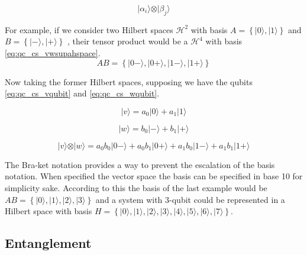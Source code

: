 \begin{equation} 
\label{eq:qc_cs_vwspace} 
\vert \alpha_{i} \rangle \otimes \vert \beta_{j} \rangle
\end{equation}


For example, if we consider two Hilbert spaces $\mathcal{H}^2$ with basis
$ A=\left\{ \vert 0 \rangle , \vert 1 \rangle \right\}$ and 
$B =\left\{ \vert - \rangle, \vert + \rangle \right\}$
, their tensor product would be a $\mathcal{H}^4$ with basis \ref{eq:qc_cs_vwsupahspace}.
\begin{equation}
\label{eq:qc_cs_vwsupahspace}
AB = \left\{ \vert 0  - \rangle, \vert 0 + \rangle, \vert 1 - \rangle,  \vert 1 + \rangle \right\}
\end{equation}

Now taking the former Hilbert spaces, supposing we have the qubits \ref{eq:qc_cs_vqubit} and \ref{eq:qc_cs_wqubit}.

\begin{equation}
\label{eq:qc_cs_vqubit}
\vert v \rangle = a_{0}\vert 0\rangle + a_{1}\vert 1 \rangle
\end{equation}

\begin{equation}
\label{eq:qc_cs_wqubit}
\vert w \rangle = b_{0}\vert -\rangle + b_{1}\vert + \rangle
\end{equation}

\begin{equation}
\label{eq:qc_cs_vwsupahspace2}
\vert v \rangle \otimes \vert w \rangle = a_{0}b_{0}\vert 0  - \rangle + a_{0}b_{1}\vert 0 + \rangle + a_{1}b_{0}\vert 1 - \rangle +  a_{1}b_{1}\vert 1 + \rangle 
\end{equation}

The Bra-ket notation provides a way to prevent the escalation of the basis notation. When specified the vector space the basis can be specified in base 10 for simplicity sake. According to this the basis of the last example would be $AB = \left\{ \vert 0 \rangle, \vert 1 \rangle, \vert 2 \rangle,  \vert 3 \rangle \right\}$ and a system with $3$-qubit could be represented in a Hilbert space with basis $H= \left\{ \vert 0 \rangle, \vert 1 \rangle, \vert 2 \rangle,  \vert 3 \rangle,  \vert 4 \rangle,  \vert 5 \rangle,  \vert 6 \rangle,  \vert 7 \rangle \right\}$.



\subsection{Entanglement}
\label{subsec:entanglement}

